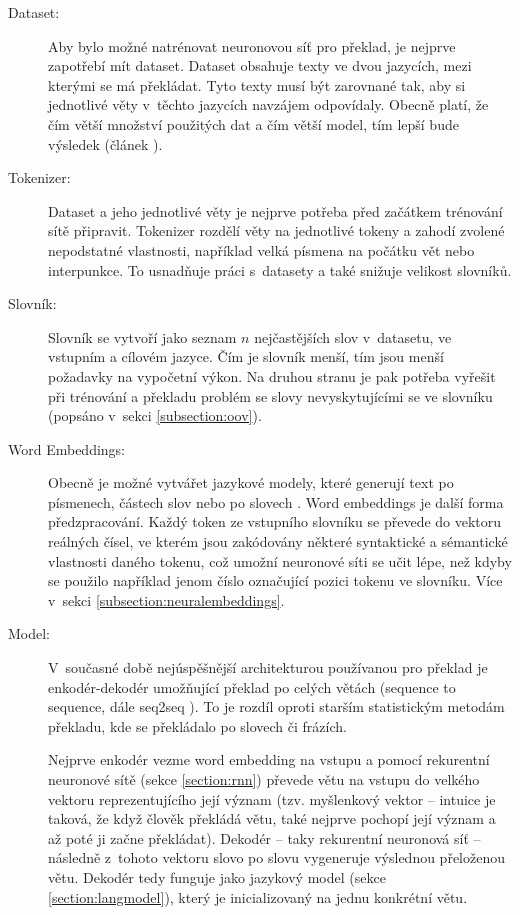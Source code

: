 \begin{description}
  \item[Dataset:] Aby bylo možné natrénovat neuronovou síť pro překlad, je nejprve zapotřebí mít dataset. Dataset obsahuje texty ve dvou jazycích, mezi kterými se má překládat. Tyto texty musí být zarovnané tak, aby si jednotlivé věty v~těchto jazycích navzájem odpovídaly. Obecně platí, že čím větší množství použitých dat a čím větší model, tím lepší bude výsledek (článek \cite{googleLimits}).

  \item[Tokenizer:] Dataset a jeho jednotlivé věty je nejprve potřeba před začátkem trénování sítě připravit. Tokenizer rozdělí věty na jednotlivé tokeny a zahodí zvolené nepodstatné vlastnosti, například velká písmena na počátku vět nebo interpunkce. To usnadňuje práci s~datasety a také snižuje velikost slovníků.

  \item[Slovník:] Slovník se vytvoří jako seznam $n$ nejčastějších slov v~datasetu, ve vstupním a cílovém jazyce. Čím je slovník menší, tím jsou menší požadavky na vypočetní výkon. Na druhou stranu je pak potřeba vyřešit při trénování a překladu problém se slovy nevyskytujícími se ve slovníku (popsáno v~sekci \ref{subsection:oov}).

  \item[Word Embeddings:] Obecně je možné vytvářet jazykové modely, které generují text po písmenech, částech slov nebo po slovech \cite{mikolovSubwords}. Word embeddings je další forma předzpracování. Každý token ze vstupního slovníku se převede do vektoru reálných čísel, ve kterém jsou zakódovány některé syntaktické a sémantické vlastnosti daného tokenu, což umožní neuronové síti se učit lépe, než kdyby se použilo například jenom číslo označující pozici tokenu ve slovníku. Více v~sekci \ref{subsection:neuralembeddings}.

  \item[Model:] V~současné době nejúspěšnější architekturou používanou pro překlad je enkodér-dekodér umožňující překlad po celých větách (sequence to sequence, dále seq2seq \cite{seq2seq}). To je rozdíl oproti starším statistickým metodám překladu, kde se překládalo po slovech či frázích.

      Nejprve enkodér vezme word embedding na vstupu a pomocí rekurentní neuronové sítě (sekce \ref{section:rnn}) převede větu na vstupu do velkého vektoru reprezentujícího její význam (tzv. myšlenkový vektor -- intuice je taková, že když člověk překládá větu, také nejprve pochopí její význam a až poté ji začne překládat). Dekodér -- taky rekurentní neuronová síť -- následně z~tohoto vektoru slovo po slovu vygeneruje výslednou přeloženou větu. Dekodér tedy funguje jako jazykový model (sekce \ref{section:langmodel}), který je inicializovaný na jednu konkrétní větu.
\end{description}


